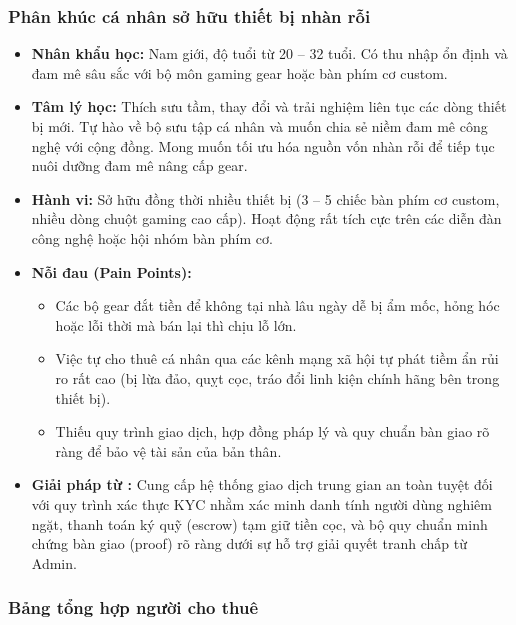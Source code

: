 \subsubsection{Phân khúc cá nhân sở hữu thiết bị nhàn rỗi}
\begin{itemize}
    \item \textbf{Nhân khẩu học:} Nam giới, độ tuổi từ 20 -- 32 tuổi. Có thu nhập ổn định và đam mê sâu sắc với bộ môn gaming gear hoặc bàn phím cơ custom.
    \item \textbf{Tâm lý học:} Thích sưu tầm, thay đổi và trải nghiệm liên tục các dòng thiết bị mới. Tự hào về bộ sưu tập cá nhân và muốn chia sẻ niềm đam mê công nghệ với cộng đồng. Mong muốn tối ưu hóa nguồn vốn nhàn rỗi để tiếp tục nuôi dưỡng đam mê nâng cấp gear.
    \item \textbf{Hành vi:} Sở hữu đồng thời nhiều thiết bị (3 -- 5 chiếc bàn phím cơ custom, nhiều dòng chuột gaming cao cấp). Hoạt động rất tích cực trên các diễn đàn công nghệ hoặc hội nhóm bàn phím cơ.
    \item \textbf{Nỗi đau (Pain Points):}
    \begin{itemize}
        \item Các bộ gear đắt tiền để không tại nhà lâu ngày dễ bị ẩm mốc, hỏng hóc hoặc lỗi thời mà bán lại thì chịu lỗ lớn.
        \item Việc tự cho thuê cá nhân qua các kênh mạng xã hội tự phát tiềm ẩn rủi ro rất cao (bị lừa đảo, quỵt cọc, tráo đổi linh kiện chính hãng bên trong thiết bị).
        \item Thiếu quy trình giao dịch, hợp đồng pháp lý và quy chuẩn bàn giao rõ ràng để bảo vệ tài sản của bản thân.
    \end{itemize}
    \item \textbf{Giải pháp từ \projectname{}:} Cung cấp hệ thống giao dịch trung gian an toàn tuyệt đối với quy trình xác thực KYC nhằm xác minh danh tính người dùng nghiêm ngặt, thanh toán ký quỹ (escrow) tạm giữ tiền cọc, và bộ quy chuẩn minh chứng bàn giao (proof) rõ ràng dưới sự hỗ trợ giải quyết tranh chấp từ Admin.
\end{itemize}

\subsubsection{Bảng tổng hợp người cho thuê}

